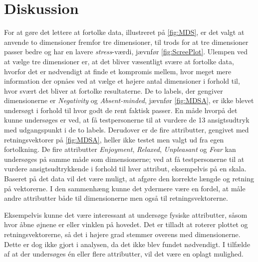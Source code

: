\section*{Diskussion}
\label{Diskussion}
%
For at gøre det lettere at fortolke data, illustreret på \autoref{fig:MDS}, er det valgt at anvende to dimensioner fremfor tre dimensioner, til trods for at tre dimensioner passer bedre og har en lavere \textit{stress}-værdi, jævnfør \autoref{fig:ScreePlot}. Ulempen ved at vælge tre dimensioner er, at det bliver væsentligt svære at fortolke data, hvorfor det er nødvendigt at finde et kompromis mellem, hvor meget mere information der opnåes ved at vælge et højere antal dimensioner i forhold til, hvor svært det bliver at fortolke resultaterne. \blankline
%
De to labels, der gengiver dimensionerne er \textit{Negativity} og \textit{Absent-minded}, jævnfør \autoref{fig:MDSA}, er ikke blevet undersøgt i forhold til hvor godt de rent faktisk passer. En måde hvorpå det kunne undersøges er ved, at få testpersonerne til at vurdere de 13 ansigtsudtryk med udgangspunkt i de to labels. Derudover er de fire attributter, gengivet med retningsvektorer på \autoref{fig:MDSA}, heller ikke testet men valgt ud fra egen fortolkning. De fire attributter \textit{Enjoyment}, \textit{Relaxed}, \textit{Unpleasant} og \textit{Fear} kan undersøges på samme måde som dimensionerne; ved at få testpersonerne til at vurdere ansigtsudtrykkende i forhold til hver attribut, eksempelvis på en skala. Baseret på det data vil det være muligt, at afgøre den korrekte længde og retning på vektorerne. I den sammenhæng kunne det ydermere være en fordel, at måle andre attributter både til dimensionerne men også til retningsvektorerne. 

Eksempelvis kunne det være interessant at undersøge fysiske attributter, såsom hvor åbne øjnene er eller vinklen på hovedet.\blankline     
%
Det er tilladt at roterer plottet og retningsvektorerne, så det i højere grad stemmer overens med dimensionerne. Dette er dog ikke gjort i analysen, da det ikke blev fundet nødvendigt. I tilfælde af at der undersøges én eller flere attributter, vil det være en oplagt mulighed.
